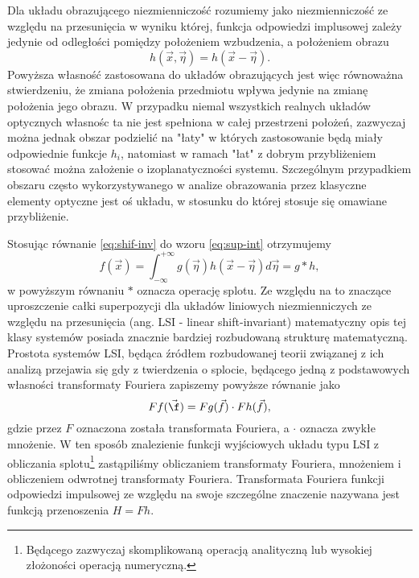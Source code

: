 Dla układu obrazującego niezmienniczość rozumiemy jako niezmienniczość ze względu na przesunięcia w wyniku której, funkcja odpowiedzi implusowej zależy jedynie od odległości pomiędzy położeniem wzbudzenia, a położeniem obrazu
\begin{equation}
h(\vec{x},\vec{\eta})=h(\vec{x}-\vec{\eta}).
\label{eq:shif-inv}
\end{equation}
Powyższa własność zastosowana do układów obrazujących jest więc równoważna stwierdzeniu, że zmiana położenia przedmiotu wpływa jedynie na zmianę położenia jego obrazu. W przypadku niemal wszystkich realnych układów optycznych własnośc ta nie jest spełniona w całej przestrzeni położeń, zazwyczaj można jednak obszar podzielić na "łaty" w których zastosowanie będą miały odpowiednie funkcje $h_i$, natomiast w ramach "łat" z dobrym przybliżeniem stosować można założenie o izoplanatyczności systemu. Szczególnym przypadkiem obszaru często wykorzystywanego w analize obrazowania przez klasyczne elementy optyczne jest oś układu, w stosunku do której stosuje się omawiane przybliżenie.

Stosując równanie \ref{eq:shif-inv} do wzoru \ref{eq:sup-int} otrzymujemy
\begin{equation}
f(\vec{x})=\int_{-\infty}^{+\infty} g(\vec{\eta})  h(\vec{x}-\vec{\eta}) d \vec{\eta} = g \ast h,
\label{eq:splot}
\end{equation}
w powyższym równaniu $\ast$ oznacza operację splotu. Ze względu na to znaczące uproszczenie całki superpozycji dla układów liniowych niezmienniczych ze względu na przesunięcia (ang. LSI - linear shift-invariant) matematyczny opis tej klasy systemów posiada znacznie bardziej rozbudowaną strukturę matematyczną. Prostota systemów LSI, będąca źródłem rozbudowanej teorii związanej z ich analizą przejawia się gdy z twierdzenia o splocie, będącego jedną z podstawowych własności transformaty Fouriera zapiszemy powyższe równanie jako
\begin{equation}
F{f}(\vec{\f}) = F{g}(\vec{f}) \cdot F{h}(\vec{f}),
\label{eq:transfer-mult}
\end{equation}
gdzie przez $F$ oznaczona została transformata Fouriera, a $\cdot$ oznacza zwykłe mnożenie. W ten sposób znalezienie funkcji wyjściowych układu typu LSI z obliczania splotu\footnote{Będącego zazwyczaj skomplikowaną operacją analityczną lub wysokiej złożoności operacją numeryczną.} zastąpiliśmy obliczaniem transformaty Fouriera, mnożeniem i obliczeniem odwrotnej transformaty Fouriera. Transformata Fouriera funkcji odpowiedzi impulsowej ze względu na swoje szczególne znaczenie nazywana jest funkcją przenoszenia $H=F{h}$.

